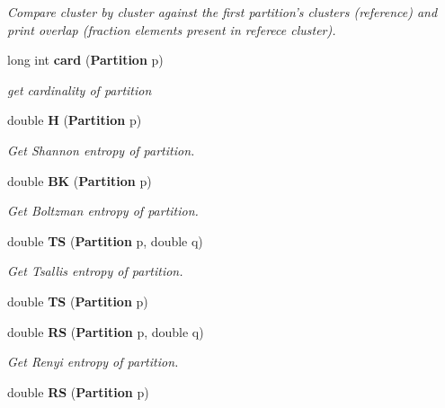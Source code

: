 \begin{CompactItemize}
\begin{CompactList}\small\item\em Compare cluster by cluster against the first partition's clusters (reference) and print overlap (fraction elements present in referece cluster). \item\end{CompactList}\item 
long int {\bf card} ({\bf Partition} p)\label{classPartitionStats_a23}

\begin{CompactList}\small\item\em get cardinality of partition \item\end{CompactList}\item 
double {\bf H} ({\bf Partition} p)\label{classPartitionStats_a24}

\begin{CompactList}\small\item\em Get Shannon entropy of partition. \item\end{CompactList}\item 
double {\bf BK} ({\bf Partition} p)\label{classPartitionStats_a25}

\begin{CompactList}\small\item\em Get Boltzman entropy of partition. \item\end{CompactList}\item 
double {\bf TS} ({\bf Partition} p, double q)\label{classPartitionStats_a26}

\begin{CompactList}\small\item\em Get Tsallis entropy of partition. \item\end{CompactList}\item 
double {\bf TS} ({\bf Partition} p)\label{classPartitionStats_a27}

\item 
double {\bf RS} ({\bf Partition} p, double q)\label{classPartitionStats_a28}

\begin{CompactList}\small\item\em Get Renyi entropy of partition. \item\end{CompactList}\item 
double {\bf RS} ({\bf Partition} p)\label{classPartitionStats_a29}


\end{CompactItemize}
